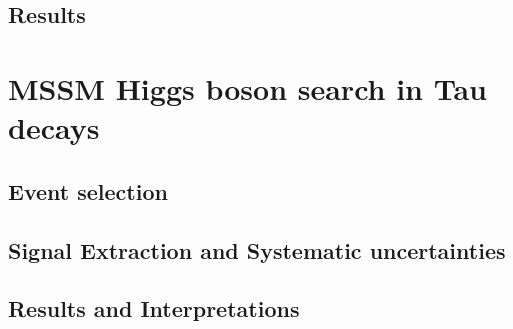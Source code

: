 \subsection{Results}

\section{MSSM Higgs boson search in Tau decays}

\subsection{Event selection}

\subsection{Signal Extraction and Systematic uncertainties}

\subsection{Results and Interpretations}


